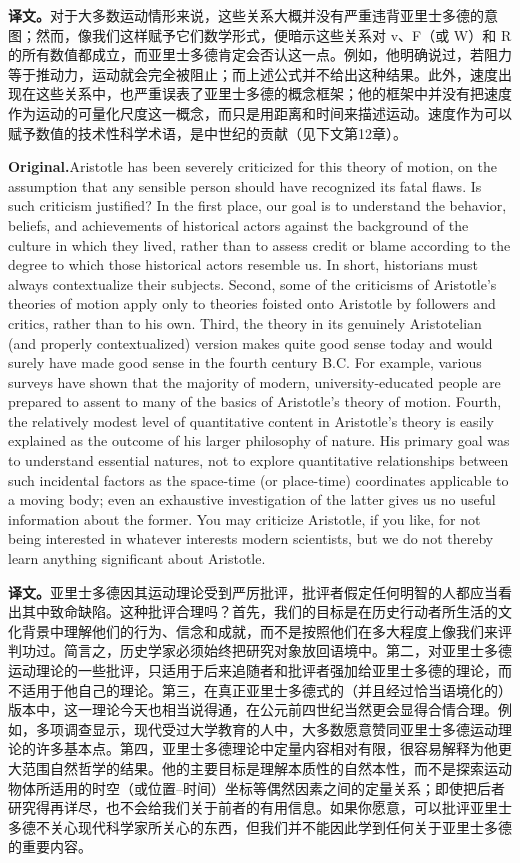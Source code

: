\documentclass[UTF8]{ctexart}
\newcommand{\orig}{\par\noindent\textbf{Original.}\quad}
\newcommand{\zh}{\par\noindent\textbf{译文。}\quad}
\begin{document}
\zh 对于大多数运动情形来说，这些关系大概并没有严重违背亚里士多德的意图；然而，像我们这样赋予它们数学形式，便暗示这些关系对 v、F（或 W）和 R 的所有数值都成立，而亚里士多德肯定会否认这一点。例如，他明确说过，若阻力等于推动力，运动就会完全被阻止；而上述公式并不给出这种结果。此外，速度出现在这些关系中，也严重误表了亚里士多德的概念框架；他的框架中并没有把速度作为运动的可量化尺度这一概念，而只是用距离和时间来描述运动。速度作为可以赋予数值的技术性科学术语，是中世纪的贡献（见下文第12章）。

\orig Aristotle has been severely criticized for this theory of motion, on the assumption that any sensible person should have recognized its fatal flaws. Is such criticism justified? In the first place, our goal is to understand the behavior, beliefs, and achievements of historical actors against the background of the culture in which they lived, rather than to assess credit or blame according to the degree to which those historical actors resemble us. In short, historians must always contextualize their subjects. Second, some of the criticisms of Aristotle's theories of motion apply only to theories foisted onto Aristotle by followers and critics, rather than to his own. Third, the theory in its genuinely Aristotelian (and properly contextualized) version makes quite good sense today and would surely have made good sense in the fourth century B.C. For example, various surveys have shown that the majority of modern, university-educated people are prepared to assent to many of the basics of Aristotle's theory of motion. Fourth, the relatively modest level of quantitative content in Aristotle's theory is easily explained as the outcome of his larger philosophy of nature. His primary goal was to understand essential natures, not to explore quantitative relationships between such incidental factors as the space-time (or place-time) coordinates applicable to a moving body; even an exhaustive investigation of the latter gives us no useful information about the former. You may criticize Aristotle, if you like, for not being interested in whatever interests modern scientists, but we do not thereby learn anything significant about Aristotle.

\zh 亚里士多德因其运动理论受到严厉批评，批评者假定任何明智的人都应当看出其中致命缺陷。这种批评合理吗？首先，我们的目标是在历史行动者所生活的文化背景中理解他们的行为、信念和成就，而不是按照他们在多大程度上像我们来评判功过。简言之，历史学家必须始终把研究对象放回语境中。第二，对亚里士多德运动理论的一些批评，只适用于后来追随者和批评者强加给亚里士多德的理论，而不适用于他自己的理论。第三，在真正亚里士多德式的（并且经过恰当语境化的）版本中，这一理论今天也相当说得通，在公元前四世纪当然更会显得合情合理。例如，多项调查显示，现代受过大学教育的人中，大多数愿意赞同亚里士多德运动理论的许多基本点。第四，亚里士多德理论中定量内容相对有限，很容易解释为他更大范围自然哲学的结果。他的主要目标是理解本质性的自然本性，而不是探索运动物体所适用的时空（或位置--时间）坐标等偶然因素之间的定量关系；即使把后者研究得再详尽，也不会给我们关于前者的有用信息。如果你愿意，可以批评亚里士多德不关心现代科学家所关心的东西，但我们并不能因此学到任何关于亚里士多德的重要内容。
\end{document}
